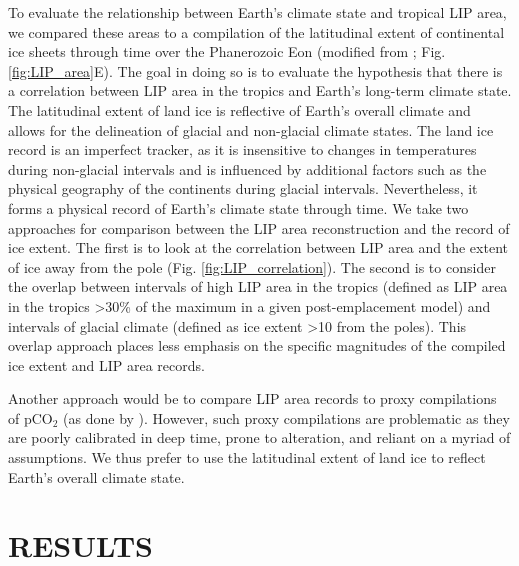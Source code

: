 \documentclass[11pt,letterpaper]{article}
\begin{document}
To evaluate the relationship between Earth's climate state and tropical LIP area, we compared these areas to a compilation of the latitudinal extent of continental ice sheets through time over the Phanerozoic Eon (modified from \citealp{Royer2004a}; Fig. \ref{fig:LIP_area}E). The goal in doing so is to evaluate the hypothesis that there is a correlation between LIP area in the tropics and Earth's long-term climate state. The latitudinal extent of land ice is reflective of Earth's overall climate and allows for the delineation of glacial and non-glacial climate states. The land ice record is an imperfect tracker, as it is insensitive to changes in temperatures during non-glacial intervals and is influenced by additional factors such as the physical geography of the continents during glacial intervals. Nevertheless, it forms a physical record of Earth's climate state through time. We take two approaches for comparison between the LIP area reconstruction and the record of ice extent. The first is to look at the correlation between LIP area and the extent of ice away from the pole (Fig. \ref{fig:LIP_correlation}). The second is to consider the overlap between intervals of high LIP area in the tropics (defined as LIP area in the tropics \textgreater30\% of the maximum in a given post-emplacement model) and intervals of glacial climate (defined as ice extent \textgreater10\textdegree\xspace from the poles). This overlap approach places less emphasis on the specific magnitudes of the compiled ice extent and LIP area records.

Another approach would be to compare LIP area records to proxy compilations of pCO$_2$ (as done by \citealp{Johansson2018a}). However, such proxy compilations are problematic as they are poorly calibrated in deep time, prone to alteration, and reliant on a myriad of assumptions. We thus prefer to use the latitudinal extent of land ice to reflect Earth's overall climate state.

\section*{RESULTS}
\end{document}
